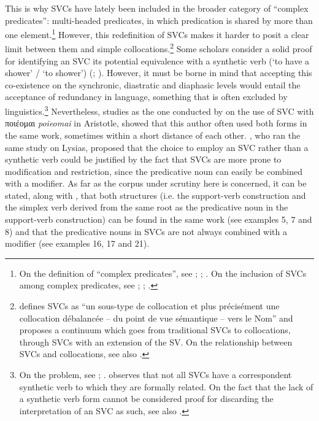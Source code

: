 \documentclass[output=paper,colorlinks,citecolor=brown]{langscibook}
\begin{document}
This is why SVCs have lately been included in the broader category of “complex predicates”: multi-headed predicates, in which predication is shared by more than one element.\footnote{On the definition of “complex predicates”, see \citet[1]{AlsinaBresnanSells1997}; \citet[165]{Bowern2008}; \citet[49]{Butt2010}. On the inclusion of SVCs among complex predicates, see \citet{Bowern2008}; \citet{Butt2010}; \citet[xxiii-xxix]{PompeiMereu2019}.}  However, this redefinition of SVCs makes it harder to posit a clear limit between them and simple collocations.\footnote{\citet[186]{Jezek2004} defines SVCs as “un sous-type de collocation et plus précisément une collocation débalancée – du point de vue sémantique – vers le Nom” and proposes a continuum which goes from traditional SVCs to collocations, through SVCs with an extension of the SV. On the relationship between SVCs and collocations, see also \citet[195--198]{ElisabettaJežek2011}.}  Some scholars consider a solid proof for identifying an SVC its potential equivalence with a synthetic verb (‘to have a shower’ / ‘to shower’) (\citealt[169--170]{langer2004linguistic}; \citet[xxvi]{PompeiMereu2019}). However, it must be borne in mind that accepting this co-existence on the synchronic, diastratic and diaphasic levels would entail the acceptance of redundancy in language, something that is often excluded by linguistics.\footnote{On the problem, see \citet{JiménezLópez2011}; \citet[18]{Fendel2020}. \citet[120]{Pompei2017} observes that not all SVCs have a correspondent synthetic verb to which they are formally related. On the fact that the lack of a synthetic verb form cannot be considered proof for discarding the interpretation of an SVC as such, see also \citet[155]{Marini2010}.} Nevertheless, studies as the one conducted by \citet[159--164]{Marini2010} on the use of SVC with ποιέομαι \textit{poieomai} in Aristotle, showed that this author often used both forms in the same work, sometimes within a short distance of each other. \citet{JiménezLópez2011}, who ran the same study on Lysias, proposed that the choice to employ an SVC rather than a synthetic verb could be justified by the fact that SVCs are more prone to modification and restriction, since the predicative noun can easily be combined with a modifier. As far as the corpus under scrutiny here is concerned, it can be stated, along with \citet{Marini2010}, that both structures (i.e. the support-verb construction and the simplex verb derived from the same root as the predicative noun in the support-verb construction) can be found in the same work (see examples 5, 7 and 8) and that the predicative nouns in SVCs are not always combined with a modifier (see examples 16, 17 and 21).
\end{document}
